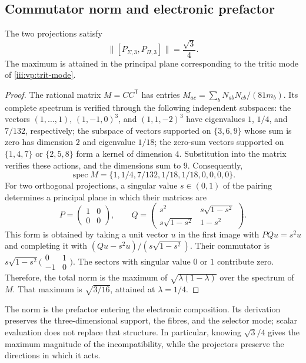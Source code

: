 \subsection{Commutator norm and electronic prefactor}

\begin{theorem}
The two projections satisfy
\begin{equation}
 \bigl\|[P_{\Sigma,3},P_{\Pi,3}]\bigr\|=\frac{\sqrt3}{4}.
 \label{iii:vp:prefactor}
\end{equation}
The maximum is attained in the principal plane corresponding to the
tritic mode of \eqref{iii:vp:trit-mode}.
\end{theorem}
\begin{proof}
The rational matrix $M=CC^{\mathsf T}$ has entries
$M_{ac}=\sum_bN_{ab}N_{cb}/(81m_b)$. Its complete spectrum is
verified through the following independent subspaces: the
vectors $(1,\ldots,1)$, $(1,-1,0)^3$, and $(1,1,-2)^3$ have
eigenvalues $1$, $1/4$, and $7/132$, respectively; the subspace of
vectors supported on $\{3,6,9\}$ whose sum is zero has dimension
$2$ and eigenvalue $1/18$; the zero-sum vectors supported on
$\{1,4,7\}$ or $\{2,5,8\}$ form a kernel of dimension $4$.
Substitution into the matrix verifies these actions, and the dimensions
sum to $9$. Consequently,
\[
 \operatorname{spec}M=
 \{1,1/4,7/132,1/18,1/18,0,0,0,0\}.
\]
For two orthogonal projections, a singular value $s\in(0,1)$ of the
pairing determines a principal plane in which their matrices are
\[
 P=\begin{pmatrix}1&0\\0&0\end{pmatrix},\qquad
 Q=\begin{pmatrix}s^2&s\sqrt{1-s^2}\\
 s\sqrt{1-s^2}&1-s^2\end{pmatrix}.
\]
This form is obtained by taking a unit vector $u$ in the first
image with $PQu=s^2u$ and completing it with
$(Qu-s^2u)/(s\sqrt{1-s^2})$. Their commutator is
$s\sqrt{1-s^2}\bigl(\begin{smallmatrix}0&1\\-1&0\end{smallmatrix}\bigr)$.
The sectors with singular value $0$ or $1$ contribute zero.
Therefore, the total norm is the maximum of
$\sqrt{\lambda(1-\lambda)}$ over the spectrum of $M$. That maximum
is $\sqrt{3/16}$, attained at $\lambda=1/4$.
\end{proof}

The norm is the prefactor entering the electronic composition.
Its derivation preserves the three-dimensional support, the fibres, and the
selector mode; scalar evaluation does not replace that structure. In
particular, knowing $\sqrt3/4$ gives the maximum magnitude of
the incompatibility, while the projectors preserve the directions
in which it acts.

